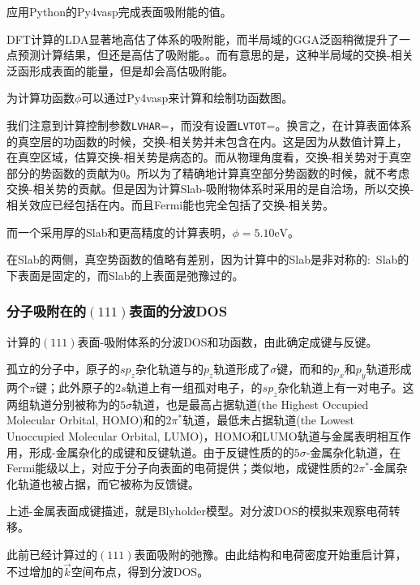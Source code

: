 应用\textrm{Python}的\textrm{Py4vasp}完成表面吸附能的值。

\textrm{DFT}计算的\textrm{LDA}显著地高估了体系的吸附能，而半局域的\textrm{GGA}泛函稍微提升了一点预测计算结果，但还是高估了吸附能。。而有意思的是，这种半局域的交换-相关泛函形成表面的能量，但是却会高估吸附能。

为计算功函数$\phi$可以通过\textrm{Py4vasp}来计算和绘制功函数图。

我们注意到计算控制参数\texttt{LVHAR}=，而没有设置\texttt{LVTOT}=。换言之，在计算表面体系的真空层的功函数的时候，交换-相关势并未包含在内。这是因为从数值计算上，在真空区域，估算交换-相关势是病态的。而从物理角度看，交换-相关势对于真空部分的势函数的贡献为0。所以为了精确地计算真空部分势函数的时候，就不考虑交换-相关势的贡献。但是因为计算\textrm{Slab}-吸附物体系时采用的是自洽场，所以交换-相关效应已经包括在内。而且\textrm{Fermi}能也完全包括了交换-相关势。

而一个采用厚的\textrm{Slab}和更高精度的计算表明，$\phi=5.10\mathrm{eV}$。

在\textrm{Slab}的两侧，真空势函数的值略有差别，因为计算中的\textrm{Slab}是非对称的:~\textrm{Slab}的下表面是固定的，而\textrm{Slab}的上表面是弛豫过的。

\subsubsection{分子吸附在的$(111)$表面的分波\textrm{DOS}}
计算的$(111)$表面-吸附体系的分波\textrm{DOS}和功函数，由此确定成键与反键。

孤立的分子中，原子的$sp_z$杂化轨道与的$p_z$轨道形成了$\sigma$键，而和的$p_x$和$p_y$轨道形成两个$\pi$键；此外原子的$2s$轨道上有一组孤对电子，的$sp_z$杂化轨道上有一对电子。这两组轨道分别被称为的$5\sigma$轨道，也是最高占据轨道\textrm{(the Highest Occupied Molecular Orbital, HOMO)}和的$2\pi^{\ast}$轨道，最低未占据轨道\textrm{(the Lowest Unoccupied Molecular Orbital, LUMO)}，\textrm{HOMO}和\textrm{LUMO}轨道与金属表明相互作用，形成-金属杂化的成键和反键轨道。由于反键性质的的$5\sigma$-金属杂化轨道，在\textrm{Fermi}能级以上，对应于分子向表面的电荷提供；类似地，成键性质的$2\pi^{\ast}$-金属杂化轨道也被占据，而它被称为反馈键。

上述-金属表面成键描述，就是\textrm{Blyholder}模型。对分波\textrm{DOS}的模拟来观察电荷转移。

此前已经计算过的$(111)$表面吸附的弛豫。由此结构和电荷密度开始重启计算，不过增加的$\vec k$空间布点，得到分波\textrm{DOS}。

